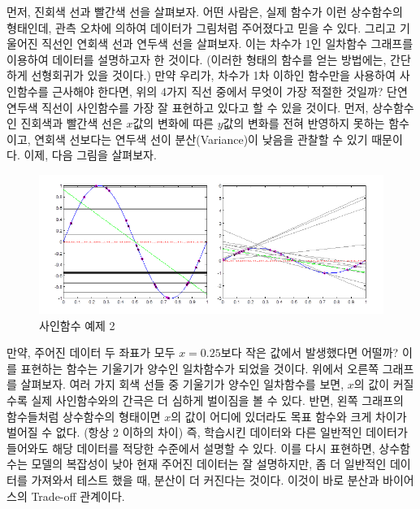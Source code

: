 \documentclass[a4paper]{oblivoir}
\begin{document}
\indent 먼저, 진회색 선과 빨간색 선을 살펴보자. 어떤 사람은, 실제 함수가 이런 상수함수의 형태인데, 관측 오차에 의하여 데이터가 그림처럼 주어졌다고 믿을 수 있다. 그리고 기울어진 직선인 연회색 선과 연두색 선을 살펴보자. 이는 차수가 1인 일차함수 그래프를 이용하여 데이터를 설명하고자 한 것이다. (이러한 형태의 함수를 얻는 방법에는, 간단하게 선형회귀가 있을 것이다.) 만약 우리가, 차수가 1차 이하인 함수만을 사용하여 사인함수를 근사해야 한다면, 위의 4가지 직선 중에서 무엇이 가장 적절한 것일까? 단연 연두색 직선이 사인함수를 가장 잘 표현하고 있다고 할 수 있을 것이다. 먼저, 상수함수인 진회색과 빨간색 선은 $x$값의 변화에 따른 $y$값의 변화를 전혀 반영하지 못하는 함수이고, 연회색 선보다는 연두색 선이 분산(Variance)이 낮음을 관찰할 수 있기 때문이다. 이제, 다음 그림을 살펴보자.
\begin{figure}[ht]
\centering
\includegraphics[scale=0.85]{BV_Tradeoff2.png}
\caption{사인함수 예제 2}
\label{Figure 6-4}
\end{figure}

\indent 만약, 주어진 데이터 두 좌표가 모두 $x=0.25$보다 작은 값에서 발생했다면 어떨까? 이를 표현하는 함수는 기울기가 양수인 일차함수가 되었을 것이다. 위에서 오른쪽 그래프를 살펴보자. 여러 가지 회색 선들 중 기울기가 양수인 일차함수를 보면, $x$의 값이 커질수록 실제 사인함수와의 간극은 더 심하게 벌이짐을 볼 수 있다. 반면, 왼쪽 그래프의 함수들처럼 상수함수의 형태이면 $x$의 값이 어디에 있더라도 목표 함수와 크게 차이가 벌어질 수 없다. (항상 2 이하의 차이) 즉, 학습시킨 데이터와 다른 일반적인 데이터가 들어와도 해당 데이터를 적당한 수준에서 설명할 수 있다. 이를 다시 표현하면, 상수함수는 모델의 복잡성이 낮아 현재 주어진 데이터는 잘 설명하지만, 좀 더 일반적인 데이터를 가져와서 테스트 했을 때, 분산이 더 커진다는 것이다. 이것이 바로 분산과 바이어스의 Trade-off 관계이다.

\end{document}
